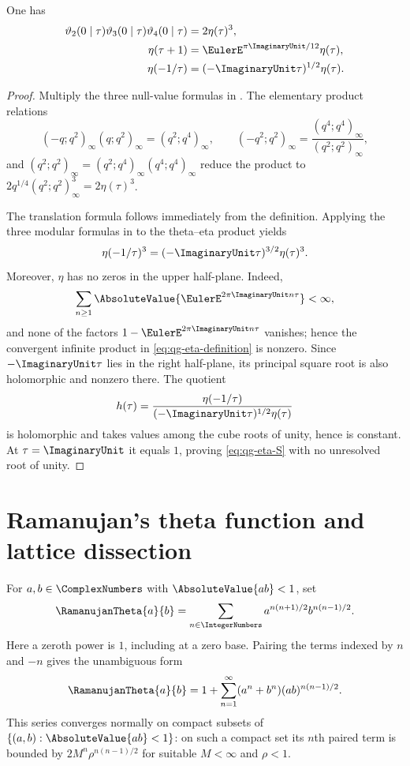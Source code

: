\begin{theorem}
\label{qg:thm-theta-eta-modular}
One has
\begin{align}
 \vartheta_2(0\mid\tau)\vartheta_3(0\mid\tau)
 \vartheta_4(0\mid\tau)&=2\eta(\tau)^3,
 \label{eq:qg-theta-eta}\\
 \eta(\tau+1)&=\EulerE^{\pi\ImaginaryUnit/12}\eta(\tau),
 \label{eq:qg-eta-T}\\
 \eta(-1/\tau)&=(-\ImaginaryUnit\tau)^{1/2}\eta(\tau).
 \label{eq:qg-eta-S}
\end{align}
\end{theorem}

\begin{proof}
Multiply the three null-value formulas in
.  The elementary product relations
\[
 (-q;q^2)_\infty(q;q^2)_\infty=(q^2;q^4)_\infty,
 \qquad
 (-q^2;q^2)_\infty=\frac{(q^4;q^4)_\infty}{(q^2;q^2)_\infty},
\]
and
$(q^2;q^2)_\infty=(q^2;q^4)_\infty(q^4;q^4)_\infty$
reduce the product to $2q^{1/4}(q^2;q^2)_\infty^3=2\eta(\tau)^3$.

The translation formula follows immediately from the definition.  Applying
the three modular formulas in  to the theta--eta
product yields
\[
 \eta(-1/\tau)^3=(-\ImaginaryUnit\tau)^{3/2}\eta(\tau)^3.
\]
Moreover, $\eta$ has no zeros in the upper half-plane.  Indeed,
\[
 \sum_{n\ge1}\AbsoluteValue{\EulerE^{2\pi\ImaginaryUnit n\tau}}<\infty,
\]
and none of the factors
$1-\EulerE^{2\pi\ImaginaryUnit n\tau}$ vanishes; hence the convergent infinite
product in \eqref{eq:qg-eta-definition} is nonzero.  Since
$-\ImaginaryUnit\tau$ lies in the right half-plane, its principal square root
is also holomorphic and nonzero there.
The quotient
\[
 h(\tau)=\frac{\eta(-1/\tau)}
 {(-\ImaginaryUnit\tau)^{1/2}\eta(\tau)}
\]
is holomorphic and takes values among the cube roots of unity, hence is
constant.  At $\tau=\ImaginaryUnit$ it equals $1$, proving
\eqref{eq:qg-eta-S} with no unresolved root of unity.
\end{proof}

\section{Ramanujan's theta function and lattice dissection}

\begin{definition}
\label{qg:def-ramanujan-theta}
For $a,b\in\ComplexNumbers$ with $\AbsoluteValue{ab}<1$, set
\begin{equation}
 \RamanujanTheta{a}{b}=\sum_{n\in\IntegerNumbers}
 a^{n(n+1)/2}b^{n(n-1)/2}.
\label{eq:qg-ramanujan-theta}
\end{equation}
Here a zeroth power is $1$, including at a zero base.  Pairing the terms
indexed by $n$ and $-n$ gives the unambiguous form
\[
 \RamanujanTheta{a}{b}=1+\sum_{n=1}^{\infty}
 (a^n+b^n)(ab)^{n(n-1)/2}.
\]
This series converges normally on compact subsets of
$\{(a,b):\AbsoluteValue{ab}<1\}$: on such a compact set its $n$th paired
term is bounded by $2M^n\rho^{n(n-1)/2}$ for suitable $M<\infty$ and
$\rho<1$.
\end{definition}


